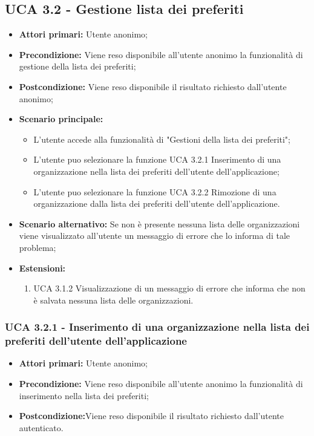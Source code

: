 \subsection{UCA 3.2 - Gestione lista dei preferiti}%
\begin{itemize}
	\item \textbf{Attori primari:} Utente anonimo;
	\item \textbf{Precondizione:} Viene reso disponibile all’utente anonimo la funzionalità di gestione della lista dei preferiti; 
	\item \textbf{Postcondizione:} Viene reso disponibile il risultato richiesto dall’utente anonimo;
	\item \textbf{Scenario principale:}
			\begin{itemize}
			\item L’utente accede alla funzionalità di "Gestioni della lista dei preferiti";
			\item L'utente puo selezionare la funzione UCA 3.2.1 Inserimento di una organizzazione nella lista dei preferiti dell’utente dell’applicazione;
			\item L'utente puo selezionare la funzione UCA 3.2.2 Rimozione di una organizzazione dalla lista dei preferiti dell’utente dell’applicazione.
			\end{itemize}
	\item \textbf{Scenario alternativo:} Se non è presente nessuna lista delle organizzazioni viene visualizzato all’utente un messaggio di errore che lo informa di tale problema;
	\item \textbf{Estensioni:}
	\begin{enumerate}
		\item UCA 3.1.2 Visualizzazione di un messaggio di errore che informa che non è salvata nessuna lista delle organizzazioni.
	\end{enumerate}
\end{itemize}

\subsubsection{UCA 3.2.1 - Inserimento di una organizzazione nella lista dei preferiti dell’utente dell’applicazione}%
\begin{itemize}
	\item \textbf{Attori primari:} Utente anonimo;
	\item \textbf{Precondizione:} Viene reso disponibile all’utente anonimo la funzionalità di inserimento nella lista dei preferiti; 
	\item \textbf{Postcondizione:}Viene reso disponibile il risultato richiesto dall’utente autenticato.
\end{itemize}

